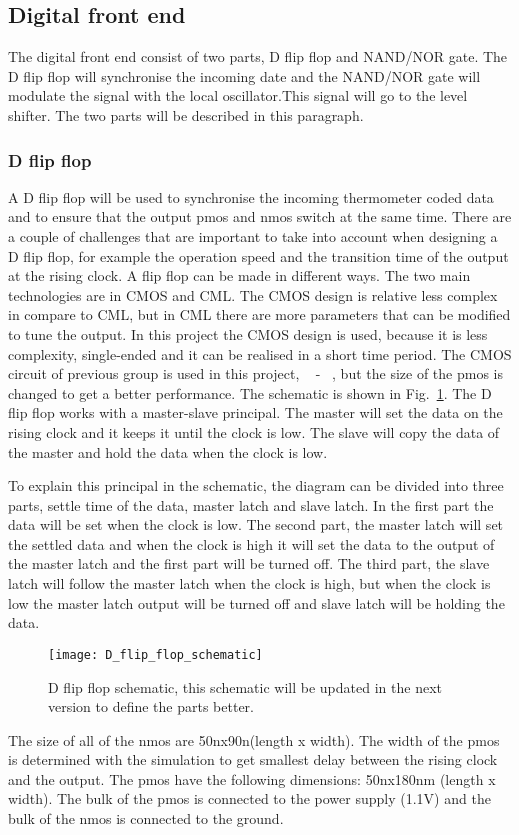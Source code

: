 \subsection{Digital front end}\label{sec:frontend}
The digital front end consist of two parts, D flip flop and NAND/NOR gate.  The D flip flop will synchronise the incoming date and the NAND/NOR gate will modulate the signal with the local oscillator.This signal will go to the level shifter. The two parts will be described in this paragraph.

\subsubsection{D flip flop}\label{sec:frontend}
A D flip flop will be used to synchronise the incoming thermometer coded data and to ensure that the output pmos and nmos switch at the same time. There are a couple of challenges that are important to take into account when designing a D flip flop, for example the operation speed and the transition time of the output at the rising clock. 
A flip flop can be made in different ways. The two main technologies are in CMOS and CML. The CMOS design is relative less complex in compare to CML, but in CML there are more parameters that can be modified to tune the output. In this project the CMOS design is used, because it is less complexity, single-ended and it can be realised in a short time period.  The CMOS circuit of previous group is used in this project, ~\cite{coursebook} - ~\cite{powerdac}, but the size of the pmos is changed to get a better performance. The schematic is shown in Fig.~\ref{fig:D_flip_flop_schematic}. The D flip flop works with a master-slave principal. The master will set the data on the rising clock and it keeps it until the clock is low. The slave will copy the data of the master and hold the data when the clock is low. 

To explain this principal in the schematic, the diagram can be divided into three parts, settle time of the data, master latch and slave latch. In the first part the data will be set when the clock is low. The second part, the master latch will set the settled data and when the clock is high it will set the data to the output of the master latch and the first part will be turned off. The third part, the slave latch will follow the master latch when the clock is high, but when the clock is low the master latch output will be turned off and slave latch will be holding the data. 
\begin{figure}[h]
 \texttt{[image: D\_flip\_flop\_schematic]}
 \caption{D flip flop schematic, this schematic will be updated in the next version to define the parts better.}
 \label{fig:D_flip_flop_schematic}
\end{figure}
The size of all of the nmos are 50nx90n(length x width). The width of the pmos is determined with the simulation to get smallest delay between the rising clock and the output. The pmos have the following dimensions: 50nx180nm (length x width). The bulk of the pmos is connected to the power supply (1.1V) and the bulk of the nmos is connected to the ground.

